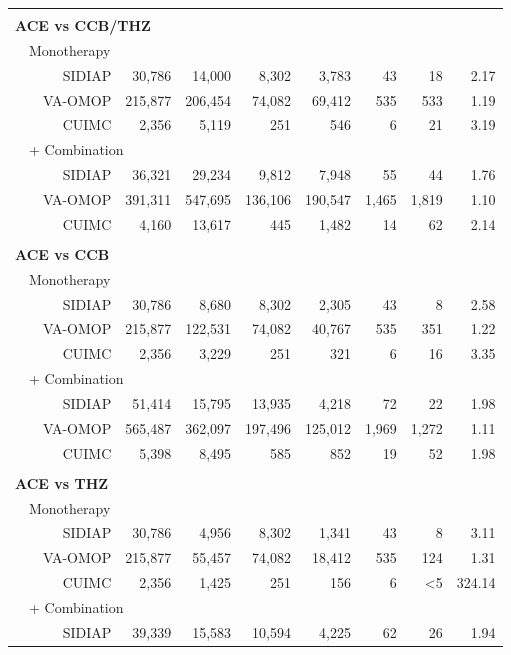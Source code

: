 \documentclass[11pt,]{article}
\begin{document}
\begin{longtable}{p{-2em}p{-2em}rrrrrrrr}
   \rowcolor{white} \\ \multicolumn{9}{l}{\textbf{ACE vs CCB/THZ}} \\ & \multicolumn{9}{l}{Monotherapy}  \\ &  & SIDIAP & 30,786 & 14,000 & 8,302 & 3,783 & 43 & 18 & 2.17 \\ 
   &  & VA-OMOP & 215,877 & 206,454 & 74,082 & 69,412 & 535 & 533 & 1.19 \\ 
   &  & CUIMC & 2,356 & 5,119 & 251 & 546 & 6 & 21 & 3.19 \\ 
                           & \multicolumn{8}{l}{+ Combination} \\ &  & SIDIAP & 36,321 & 29,234 & 9,812 & 7,948 & 55 & 44 & 1.76 \\ 
   &  & VA-OMOP & 391,311 & 547,695 & 136,106 & 190,547 & 1,465 & 1,819 & 1.10 \\ 
   &  & CUIMC & 4,160 & 13,617 & 445 & 1,482 & 14 & 62 & 2.14 \\ 
   \rowcolor{white} \\ \multicolumn{9}{l}{\textbf{ACE vs CCB}} \\ & \multicolumn{9}{l}{Monotherapy}  \\ &  & SIDIAP & 30,786 & 8,680 & 8,302 & 2,305 & 43 & 8 & 2.58 \\ 
   &  & VA-OMOP & 215,877 & 122,531 & 74,082 & 40,767 & 535 & 351 & 1.22 \\ 
   &  & CUIMC & 2,356 & 3,229 & 251 & 321 & 6 & 16 & 3.35 \\ 
                           & \multicolumn{8}{l}{+ Combination} \\ &  & SIDIAP & 51,414 & 15,795 & 13,935 & 4,218 & 72 & 22 & 1.98 \\ 
   &  & VA-OMOP & 565,487 & 362,097 & 197,496 & 125,012 & 1,969 & 1,272 & 1.11 \\ 
   &  & CUIMC & 5,398 & 8,495 & 585 & 852 & 19 & 52 & 1.98 \\ 
   \rowcolor{white} \\ \multicolumn{9}{l}{\textbf{ACE vs THZ}} \\ & \multicolumn{9}{l}{Monotherapy}  \\ &  & SIDIAP & 30,786 & 4,956 & 8,302 & 1,341 & 43 & 8 & 3.11 \\ 
   &  & VA-OMOP & 215,877 & 55,457 & 74,082 & 18,412 & 535 & 124 & 1.31 \\ 
   &  & CUIMC & 2,356 & 1,425 & 251 & 156 & 6 & <5 & 324.14 \\ 
                           & \multicolumn{8}{l}{+ Combination} \\ &  & SIDIAP & 39,339 & 15,583 & 10,594 & 4,225 & 62 & 26 & 1.94 \\ 

\end{longtable}
\end{document}
